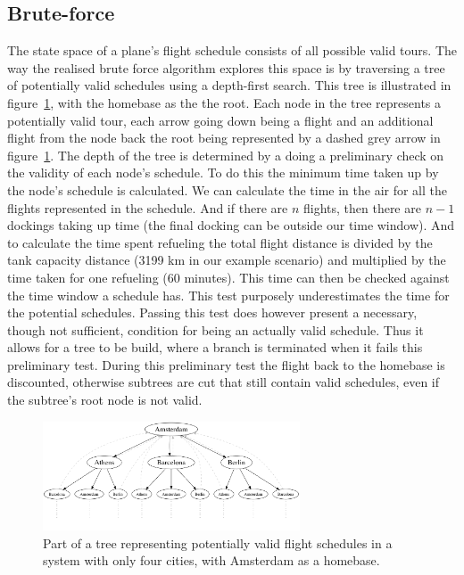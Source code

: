\documentclass[journal]{IEEEtran}
\begin{document}
\subsection{Brute-force}
The state space of a plane's flight schedule consists of all possible valid tours. The way the realised brute force algorithm explores this space is by traversing a tree of potentially valid schedules using a depth-first search. This tree is illustrated in figure~\ref{fig:tree}, with the homebase as the the root. Each node in the tree represents a potentially valid tour, each arrow going down being a flight and an additional flight from the node back the root being represented by a dashed grey arrow in figure~\ref{fig:tree}. The depth of the tree is determined by a doing a preliminary check on the validity of each node's schedule. To do this the minimum time taken up by the node's schedule is calculated. We can calculate the time in the air for all the flights represented in the schedule. And if there are $n$ flights, then there are $n-1$ dockings taking up time (the final docking can be outside our time window). And to calculate the time spent refueling the total flight distance is divided by the tank capacity distance (3199 km in our example scenario) and multiplied by the time taken for one refueling (60 minutes). This time can then be checked against the time window a schedule has. This test purposely underestimates the time for the potential schedules. Passing this test does however present a necessary, though not sufficient, condition for being an actually valid schedule. Thus it allows for a tree to be build, where a branch is terminated when it fails this preliminary test. During this preliminary test the flight back to the homebase is discounted, otherwise subtrees are cut that still contain valid schedules, even if the subtree's root node is not valid.\\
\begin{figure}[!h]
\centering
\includegraphics[width=3.0in]{bruteforce_tree}
\caption{Part of a tree representing potentially valid flight schedules in a system with only four cities, with Amsterdam as a homebase.}
\label{fig:tree}
\end{figure}
\\
\end{document}
